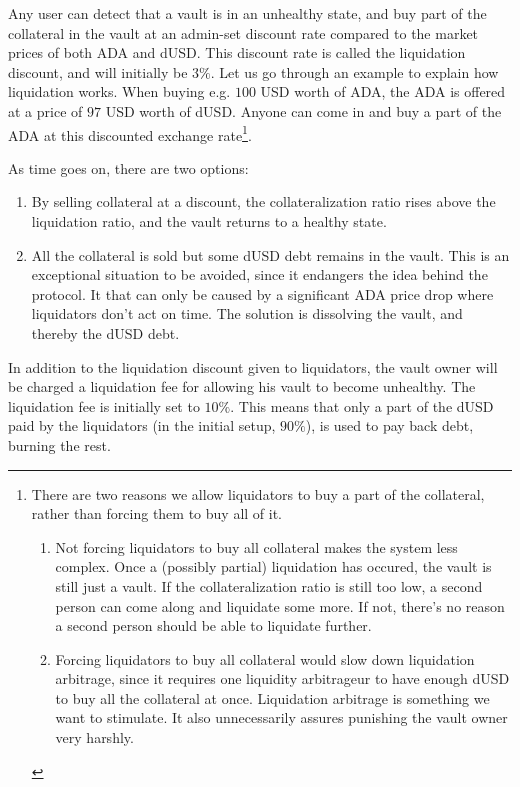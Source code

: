 \documentclass{article} %
\begin{document}
Any user can detect that a vault is in an unhealthy state, and buy part of the
collateral in the vault at an admin-set discount rate compared to the market
prices of both ADA and dUSD.
This discount rate is called the liquidation discount, and will initially be
$3\%$.
Let us go through an example to explain how liquidation works.
When buying e.g. $100$ USD worth of ADA, the ADA is offered at a price of $97$
USD worth of dUSD.
Anyone can come in and buy a part of the ADA at this discounted exchange
rate\footnote{
  There are two reasons we allow liquidators to buy a part of the collateral,
  rather than forcing them to buy all of it.
  \begin{enumerate}
    \item Not forcing liquidators to buy all collateral makes the system less
      complex. Once a (possibly partial) liquidation has occured, the vault is
      still just a vault. If the collateralization ratio is still too low, a
      second person can come along and liquidate some more. If not, there's no
      reason a second person should be able to liquidate further.
    \item Forcing liquidators to buy all collateral would slow down liquidation
      arbitrage, since it requires one liquidity arbitrageur to have enough dUSD
      to buy all the collateral at once.
      Liquidation arbitrage is something we want to stimulate.
      It also unnecessarily assures punishing the vault owner very harshly.
  \end{enumerate}
}.

As time goes on, there are two options:
\begin{enumerate}
  \item By selling collateral at a discount, the collateralization ratio rises
    above the liquidation ratio, and the vault returns to a healthy state.
  \item All the collateral is sold but some dUSD debt remains in the vault.
    This is an exceptional situation to be avoided, since it endangers the idea
    behind the protocol.
    It that can only be caused by a significant ADA price drop where liquidators
    don't act on time.
    The solution is dissolving the vault, and thereby the dUSD debt.
\end{enumerate}

In addition to the liquidation discount given to liquidators, the vault owner
will be charged a liquidation fee for allowing his vault to become unhealthy.
The liquidation fee is initially set to $10\%$.
This means that only a part of the dUSD paid by the liquidators (in the initial
setup, $90\%$), is used to pay back debt, burning the rest.
\end{document}
